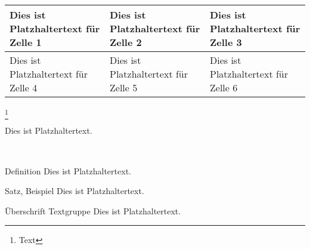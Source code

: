 \begin{table}
	\begin{tabulary}{16.3cm}{|L|L|L|}
		\hline
		Dies ist Platzhaltertext für Zelle 1 & Dies ist Platzhaltertext für Zelle 2 & Dies ist Platzhaltertext für Zelle 3\\
		\hline
		Dies ist Platzhaltertext für Zelle 4 & Dies ist Platzhaltertext für Zelle 5 & Dies ist Platzhaltertext für Zelle 6\\
		\hline
	\end{tabulary}
\end{table}





\footnote{Text}


\begin{MyToDo} %
	Dies ist Platzhaltertext.
\end{MyToDo}\\


\begin{Einzugit}{Definition}
	Dies ist Platzhaltertext.	
\end{Einzugit}


\begin{Einzugup}{Satz, Beispiel}
	Dies ist Platzhaltertext.	
\end{Einzugup}


\begin{Textgruppe}{Überschrift Textgruppe}
	Dies ist Platzhaltertext.
\end{Textgruppe}